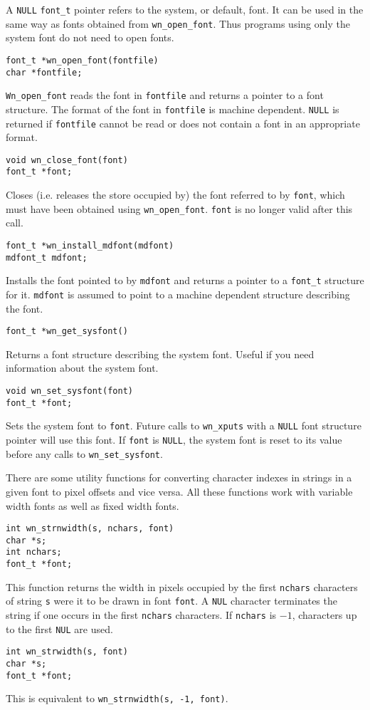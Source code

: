 A {\tt NULL} {\tt font\_t} pointer refers to the system, or default, font.
It can be used in the same way as fonts obtained from {\tt wn\_open\_font}.
Thus programs using only the system font do not need to open fonts.
\label{wn_open_font}
\begin{verbatim}
font_t *wn_open_font(fontfile)
char *fontfile;
\end{verbatim}
{\tt Wn\_open\_font} reads the font in {\tt fontfile} and returns a pointer to a 
font structure.
The format of the font in {\tt fontfile} is machine dependent.
{\tt NULL} is returned if {\tt fontfile} cannot be read or does not contain a font
in an appropriate format.
\begin{verbatim}
void wn_close_font(font)
font_t *font;
\end{verbatim}
Closes (i.e. releases the store occupied by) the font referred
to by {\tt font}, which must have been obtained using {\tt wn\_open\_font}.
{\tt font} is no longer valid after this call.
\begin{verbatim}
font_t *wn_install_mdfont(mdfont)
mdfont_t mdfont;
\end{verbatim}
Installs the font pointed to by {\tt mdfont} and returns a pointer to a
{\tt font\_t} structure for it.
{\tt mdfont} is assumed to point to a machine dependent structure
describing the font.
\begin{verbatim}
font_t *wn_get_sysfont()
\end{verbatim}
Returns a font structure describing the system font.
Useful if you need information about the system font.
\begin{verbatim}
void wn_set_sysfont(font)
font_t *font;
\end{verbatim}
Sets the system font to {\tt font}. 
Future calls to {\tt wn\_xputs} with a {\tt NULL} font structure pointer will
use this font.
If {\tt font} is {\tt NULL}, the system font is reset to its value before
any calls to {\tt wn\_set\_sysfont}.

There are some utility functions for converting character indexes
in strings in a given font to pixel offsets and vice versa.
All these functions work with variable width fonts as well as
fixed width fonts.
\begin{verbatim}
int wn_strnwidth(s, nchars, font)
char *s;
int nchars;
font_t *font;
\end{verbatim}
This function returns the width in pixels occupied by 
the first {\tt nchars} characters of string {\tt s}
were it to be drawn in font {\tt font}.
A {\tt NUL} character terminates the string if one occurs in the
first {\tt nchars} characters.
If {\tt nchars} is $-1$, characters up to the first {\tt NUL} are used.
\begin{verbatim}
int wn_strwidth(s, font)
char *s;
font_t *font;
\end{verbatim}
This is equivalent to {\tt wn\_strnwidth(s, -1, font)}.

